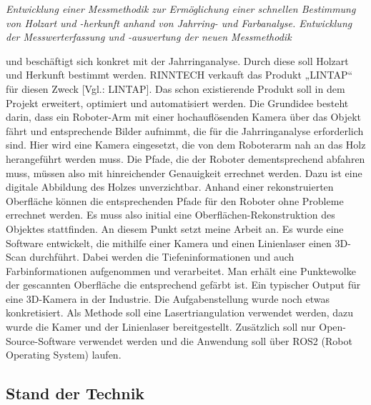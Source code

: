 	\textit{\glqq Entwicklung einer Messmethodik zur Ermöglichung einer schnellen Bestimmung von Holzart und -herkunft anhand von Jahrring- und Farbanalyse. Entwicklung der Messwerterfassung und -auswertung der neuen Messmethodik\grqq}
	
	und beschäftigt sich konkret mit der Jahrringanalyse. Durch diese soll Holzart und Herkunft bestimmt werden. RINNTECH verkauft das Produkt „LINTAP“ für diesen Zweck [Vgl.: LINTAP]. Das schon existierende Produkt soll in dem Projekt erweitert, optimiert und automatisiert werden. Die Grundidee besteht darin, dass ein Roboter-Arm mit einer hochauflösenden Kamera über das Objekt fährt und entsprechende Bilder aufnimmt, die für die Jahrringanalyse erforderlich sind. Hier wird eine Kamera eingesetzt, die von dem Roboterarm nah an das Holz herangeführt werden muss. Die Pfade, die der Roboter dementsprechend abfahren muss, müssen also mit hinreichender Genauigkeit errechnet werden. Dazu ist eine digitale Abbildung des Holzes unverzichtbar. Anhand einer rekonstruierten Oberfläche können die entsprechenden Pfade für den Roboter ohne Probleme errechnet werden. Es muss also initial eine Oberflächen-Rekonstruktion des Objektes stattfinden. An diesem Punkt setzt meine Arbeit an. Es wurde eine Software entwickelt, die mithilfe einer Kamera und einen Linienlaser einen 3D-Scan durchführt. Dabei werden die Tiefeninformationen und auch Farbinformationen aufgenommen und verarbeitet. Man erhält eine Punktewolke der gescannten Oberfläche die entsprechend gefärbt ist. Ein typischer Output für eine 3D-Kamera in der Industrie. Die  \linebreak Aufgabenstellung wurde noch etwas konkretisiert. Als Methode soll eine Lasertriangulation verwendet werden, dazu wurde die Kamer und der Linienlaser bereitgestellt. Zusätzlich soll nur Open-Source-Software verwendet werden und die Anwendung soll über ROS2 (Robot Operating System) laufen.
	
	\subsection{Stand der Technik}
